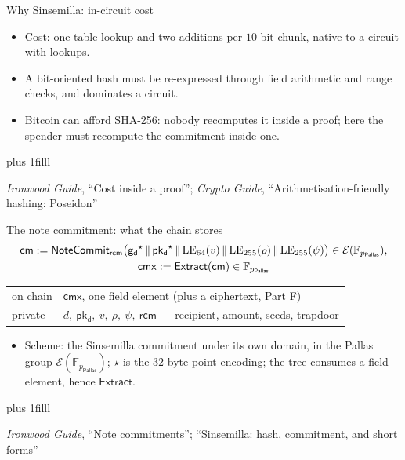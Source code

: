 \documentclass[aspectratio=169,11pt]{beamer}
\newcommand{\F}{\mathbb{F}}
\newcommand{\Ep}{\ensuremath{\mathcal{E}}}
\newcommand{\Pallas}{\ensuremath{\mathsf{Pallas}}}
\newcommand{\Fpp}{\ensuremath{\F_{p_{\Pallas}}}}
\newcommand{\cmsym}{\ensuremath{\mathsf{cm}}}
\newcommand{\cmx}{\ensuremath{\mathsf{cmx}}}
\newcommand{\gd}{\ensuremath{\mathsf{g_d}}}
\newcommand{\pkd}{\ensuremath{\mathsf{pk_d}}}
\newcommand{\rcm}{\ensuremath{\mathsf{rcm}}}
\newcommand{\Extract}{\ensuremath{\mathsf{Extract}}}
\newcommand{\NoteCommit}{\ensuremath{\mathsf{NoteCommit}}}
\newcommand{\src}[1]{\par\vskip0pt plus 1filll
  {\fontsize{6}{7.2}\selectfont\color{arbdim}\raggedright #1\par}}
\begin{document}
\begin{frame}{Why Sinsemilla: in-circuit cost}
\begin{itemize}
  \item Cost: one table lookup and two additions per $10$-bit chunk,
    native to a circuit with lookups.
  \item A bit-oriented hash must be re-expressed through field
    arithmetic and range checks, and dominates a circuit.
  \item Bitcoin can afford SHA-256: nobody recomputes it inside a
    proof; here the spender must recompute the commitment inside one.
\end{itemize}
\src{\emph{Ironwood Guide}, ``Cost inside a proof'';
  \emph{Crypto Guide}, ``Arithmetisation-friendly hashing: Poseidon''}
\end{frame}

\begin{frame}{The note commitment: what the chain stores}
\vspace*{-6pt}
\begin{gather*}
\cmsym := \NoteCommit_{\rcm}\bigl(\gd^\star \,\|\, \pkd^\star \,\|\,
  \CLE{64}(v) \,\|\, \CLE{255}(\rho) \,\|\, \CLE{255}(\psi)\bigr)
  \in \Ep(\Fpp),\\
\cmx := \Extract(\cmsym) \in \Fpp
\end{gather*}
\vspace*{-8pt}
\begin{center}\small
\begin{tabular}{@{}ll@{}}
\toprule
on chain & $\cmx$, one field element (plus a ciphertext, Part F) \\
private & $d,\ \pkd,\ v,\ \rho,\ \psi,\ \rcm$ --- recipient, amount,
  seeds, trapdoor \\
\bottomrule
\end{tabular}
\end{center}
\begin{itemize}
  \item Scheme: the Sinsemilla commitment under its own domain, in the
    Pallas group $\Ep(\Fpp)$; $\star$ is the $32$-byte point encoding;
    the tree consumes a field element, hence $\Extract$.
\end{itemize}
\src{\emph{Ironwood Guide}, ``Note commitments'';
  ``Sinsemilla: hash, commitment, and short forms''}
\end{frame}
\end{document}
